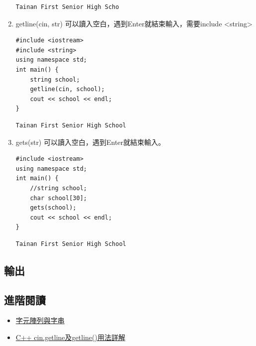 \documentclass[a4paper,12pt]{article}
\begin{document}
\begin{enumerate}
\begin{lstlisting}
\end{lstlisting}

\begin{verbatim}
Tainan First Senior High Scho
\end{verbatim}

\item getline(cin, str)
\label{sec:org08d0129}
可以讀入空白，遇到Enter就結束輸入，需要include <string>\\
\lstset{breaklines=true,language=cpp,label= ,caption= ,captionpos=b,firstnumber=1,numbers=left}
\begin{lstlisting}
#include <iostream>
#include <string>
using namespace std;
int main() {
    string school;
    getline(cin, school);
    cout << school << endl;
}
\end{lstlisting}

\begin{verbatim}
Tainan First Senior High School
\end{verbatim}
\item gets(str)
\label{sec:org7cf7379}
可以讀入空白，遇到Enter就結束輸入。\\
\lstset{breaklines=true,language=cpp,label= ,caption= ,captionpos=b,firstnumber=1,numbers=left}
\begin{lstlisting}
#include <iostream>
using namespace std;
int main() {
    //string school;
    char school[30];
    gets(school);
    cout << school << endl;
}
\end{lstlisting}

\begin{verbatim}
Tainan First Senior High School
\end{verbatim}
\end{enumerate}
\subsection{輸出}
\label{sec:orgf4f3729}
\subsection{進階閱讀}
\label{sec:org38ffc30}
\begin{itemize}
\item \href{https://openhome.cc/Gossip/CppGossip/string1.html}{字元陣列與字串}\\
\item \href{https://www.796t.com/article.php?id=13952}{C++ cin.getline及getline()用法詳解}\\
\end{itemize}
\end{document}
